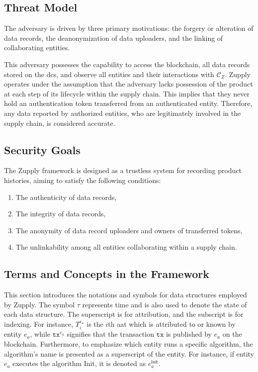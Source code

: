 \subsection{Threat Model}

The adversary is driven by three primary motivations: the forgery or alteration of data records, the deanonymization of data uploaders, and the linking of collaborating entities. 

This adversary possesses the capability to access the blockchain, all data records stored on the \gls{dcs}, and observe all entities and their interactions with $\mathcal{C}_Z$. Zupply operates under the assumption that the adversary lacks possession of the product at each step of its lifecycle within the supply chain. This implies that they never hold an authentication token transferred from an authenticated entity. Therefore, any data reported by authorized entities, who are legitimately involved in the supply chain, is considered accurate. 


\subsection{Security Goals}

The Zupply framework is designed as a trustless system for recording product histories, aiming to satisfy the following conditions:

\begin{enumerate}
\item The authenticity of data records, 
\item The integrity of data records,
\item The anonymity of data record uploaders and owners of transferred tokens,
\item The unlinkability among all entities collaborating within a supply chain.
\end{enumerate}


\subsection{Terms and Concepts in the Framework}
\label{sec:zupply-terms-and-concepts}
This section introduces the notations and symbols for data structures employed by Zupply. The symbol $\tau$ represents time and is also used to denote the state of each data structure. The superscript is for attribution, and the subscript is for indexing. For instance, \(T_i^{e_a}\) is the $i$th \gls{aat} which is attributed to or known by entity \(e_a\), while \(\texttt{tx}^{e_a}\) signifies that the transaction \(\texttt{tx}\) is published by \(e_a\) on the blockchain. Furthermore, to emphasize which entity runs a specific algorithm, the algorithm's name is presented as a superscript of the entity. For instance, if entity $e_a$ executes the algorithm \textsf{Init}, it is denoted as $e_a^\mathsf{Init}$.


